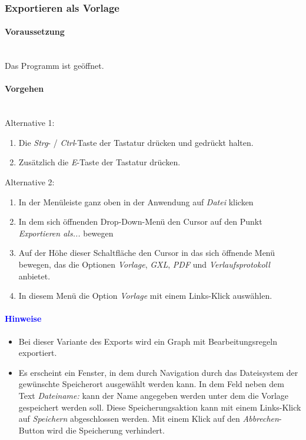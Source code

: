 \documentclass[enabledeprecatedfontcommands,fontsize=11pt,paper=a4,twoside]{scrartcl}
\newcounter{one}
\newcommand*{\hint}{\paragraph{\textcolor{blue}{Hinweise}}}
\newcommand*{\condition}{\paragraph{Voraussetzung}$\;$ \vspace{0.2cm}\\}
\newcommand*{\actions}{\paragraph{Vorgehen} $\;$\vspace{0.2cm}\\}
\begin{document}
				\newpage
		\subsubsection{Exportieren als Vorlage}
		\condition 	
		Das Programm ist geöffnet.
		\actions
		Alternative 1:
		\begin{enumerate}
				\item Die \textit{Strg}- / \textit{Ctrl}-Taste der Tastatur drücken und gedrückt halten.
				\item Zusätzlich die \textit{E}-Taste der Tastatur drücken.
		\end{enumerate}				
		Alternative 2:
		\begin{enumerate}
				\item In der Menüleiste ganz oben in der Anwendung auf \textit{Datei} klicken 
				\item In dem sich öffnenden Drop-Down-Menü den Cursor auf den Punkt \textit{Exportieren als...} bewegen
				\item Auf der Höhe dieser Schaltfläche den Cursor in das sich öffnende Menü bewegen, das die Optionen \textit{Vorlage}, \textit{GXL}, \textit{PDF} und \textit{Verlaufsprotokoll} anbietet.
				\item In diesem Menü die Option \textit{Vorlage} mit einem Links-Klick auswählen.
		\end{enumerate}		
		\hint
		\begin{itemize}
				\item Bei dieser Variante des Exports wird ein Graph mit Bearbeitungsregeln exportiert.
				\item Es erscheint ein Fenster, in dem durch Navigation durch das Dateisystem der gewünschte Speicherort ausgewählt werden kann. In dem Feld neben dem Text \textit{Dateiname:} kann der Name angegeben werden unter dem die Vorlage gespeichert werden soll. Diese Speicherungsaktion kann mit einem Links-Klick auf \textit{Speichern} abgeschlossen werden. Mit einem Klick auf den \textit{Abbrechen}-Button wird die Speicherung verhindert.
		\end{itemize}
		
							\newpage
\end{document}
